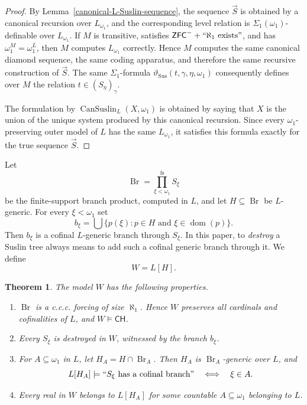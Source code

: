 \documentclass[a4paper,11pt]{article}
\newtheorem{theorem}{Theorem}[section]
\newcommand{\ZFCminus}{\mathsf{ZFC}^{-}}
\newcommand{\CH}{\mathsf{CH}}
\begin{document}
\begin{proof}
By Lemma~\ref{canonical-L-Suslin-sequence}, the sequence \(\vec S\) is
obtained by a canonical recursion over \(L_{\omega_1}\), and the corresponding
level relation is \(\Sigma_1(\omega_1)\)-definable over \(L_{\omega_1}\).
If \(M\) is transitive, satisfies \(\ZFCminus+``\aleph_1\text{ exists}"\),
and has \(\omega_1^M=\omega_1^L\), then \(M\) computes \(L_{\omega_1}\)
correctly.  Hence \(M\) computes the same canonical diamond sequence, the same
coding apparatus, and therefore the same recursive construction of
\(\vec S\).  The same \(\Sigma_1\)-formula
\(\vartheta_{\mathrm{Sus}}(t,\gamma,\eta,\omega_1)\) consequently defines over
\(M\) the relation \(t\in(S_\eta)_\gamma\).

The formulation by \(\operatorname{CanSuslin}_L(X,\omega_1)\) is obtained by
saying that \(X\) is the union of the unique system produced by this
canonical recursion.  Since every \(\omega_1\)-preserving outer model of \(L\)
has the same \(L_{\omega_1}\), it satisfies this formula exactly for the true
sequence \(\vec S\).
\end{proof}

Let
\[
   \operatorname{Br}=\prod_{\xi<\omega_1}^{\mathrm{fs}}S_\xi
\]
be the finite-support branch product, computed in $L$, and let
$H\subseteq\operatorname{Br}$ be $L$-generic.  For every $\xi<\omega_1$ set
\[
   b_\xi=\bigcup\{p(\xi):p\in H\text{ and }\xi\in\operatorname{dom}(p)\}.
\]
Then $b_\xi$ is a cofinal $L$-generic branch through $S_\xi$.  In this paper,
to \emph{destroy} a Suslin tree always means to add such a cofinal generic
branch through it.  We define
\[
   W=L[H].
\]

\begin{theorem}\label{properties-of-W}
The model $W$ has the following properties.
\begin{enumerate}
\item $\operatorname{Br}$ is a c.c.c. forcing of size $\aleph_1$.  Hence $W$
      preserves all cardinals and cofinalities of $L$, and $W\models\CH$.
\item Every $S_\xi$ is destroyed in $W$, witnessed by the branch $b_\xi$.
\item For $A\subseteq\omega_1$ in $L$, let
      $H_A=H\cap\operatorname{Br}_A$.  Then $H_A$ is
      $\operatorname{Br}_A$-generic over $L$, and
      \[
         L[H_A]\models
         ``S_\xi\text{ has a cofinal branch}"
         \quad\Longleftrightarrow\quad \xi\in A.
      \]
\item Every real in $W$ belongs to $L[H_A]$ for some countable
      $A\subseteq\omega_1$ belonging to $L$.
\end{enumerate}
\end{theorem}
\end{document}

